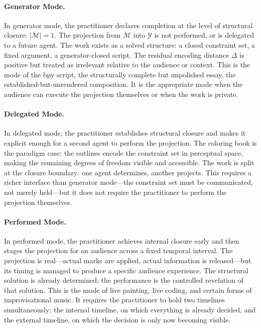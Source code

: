 \documentclass[11pt, twoside]{article}
\theoremstyle{plain}
\theoremstyle{definition}
\theoremstyle{remark}
\begin{document}
\paragraph{Generator Mode.}
In generator mode, the practitioner declares completion at the level of structural closure: $|\mathcal{M}| = 1$. The projection from $\mathcal{M}$ into $\mathcal{Y}$ is not performed, or is delegated to a future agent. The work exists as a solved structure: a closed constraint set, a fixed argument, a generator-closed script. The residual encoding distance $\Delta$ is positive but treated as irrelevant relative to the audience or context. This is the mode of the bpy script, the structurally complete but unpolished essay, the established-but-unrendered composition. It is the appropriate mode when the audience can execute the projection themselves or when the work is private.

\paragraph{Delegated Mode.}
In delegated mode, the practitioner establishes structural closure and makes it explicit enough for a second agent to perform the projection. The coloring book is the paradigm case: the outlines encode the constraint set in perceptual space, making the remaining degrees of freedom visible and accessible. The work is split at the closure boundary: one agent determines, another projects. This requires a richer interface than generator mode---the constraint set must be communicated, not merely held---but it does not require the practitioner to perform the projection themselves.

\paragraph{Performed Mode.}
In performed mode, the practitioner achieves internal closure early and then stages the projection for an audience across a fixed temporal interval. The projection is real---actual marks are applied, actual information is released---but its timing is managed to produce a specific audience experience. The structural solution is already determined; the performance is the controlled revelation of that solution. This is the mode of live painting, live coding, and certain forms of improvisational music. It requires the practitioner to hold two timelines simultaneously: the internal timeline, on which everything is already decided, and the external timeline, on which the decision is only now becoming visible.
\end{document}

